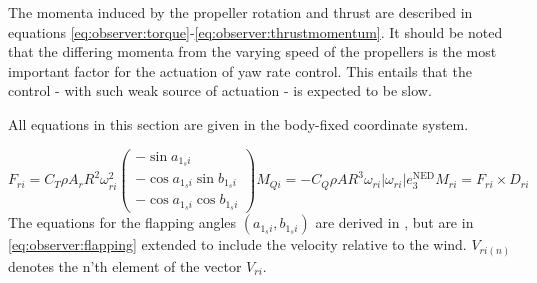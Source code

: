     The momenta induced by the propeller rotation and thrust
    are described in equations \eqref{eq:observer:torque}-\eqref{eq:observer:thrustmomentum}.
    It should be noted that the differing momenta from the varying speed of the
    propellers is the most important factor for the actuation of yaw rate control.
    This entails that the control - with such weak source of actuation - is expected to be slow.

    All equations in this section are given in the body-fixed coordinate system.

    \begin{subequations}
        \begin{equation}
            \label{eq:observer:thrust}
            F_{ri} = C_{T} \rho A_{r} R^{2} \omega_{ri}^{2}\left(
                \begin{array}{c}
                    -\sin{a_{1_{s}i}} \\
                    -\cos{a_{1_{s}i}}\sin{b_{1_{s}i}} \\
                    -\cos{a_{1_{s}i}}\cos{b_{1_{s}i}}
                \end{array}\right)
        \end{equation}

        \begin{equation}
            \label{eq:observer:torque}
            M_{Qi} = -C_{Q} \rho A R^{3} \omega_{ri}|\omega_{ri}|e_{3}^{\text{NED}}
        \end{equation}

        \begin{equation}
            \label{eq:observer:thrustmomentum}
            M_{ri} = F_{ri} \times D_{ri}
        \end{equation}
    \end{subequations}
    The equations for the flapping angles $\left(a_{1_{s}i}, b_{1_{s}i}\right)$ are
    derived in \citep{Pounds_modellingand,prouty1995helicopter,leishman2002principles},
    but are in \eqref{eq:observer:flapping} extended to include the velocity relative to the wind.
    $V_{ri(n)}$ denotes the n'th element of the vector $V_{ri}$.
